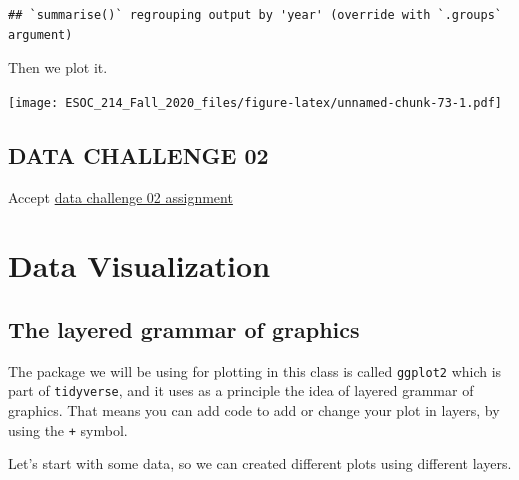 \documentclass[
]{book}
\newenvironment{Shaded}{\begin{snugshade}}{\end{snugshade}}
\newcommand{\DataTypeTok}[1]{\textcolor[rgb]{0.13,0.29,0.53}{#1}}
\newcommand{\KeywordTok}[1]{\textcolor[rgb]{0.13,0.29,0.53}{\textbf{#1}}}
\newcommand{\NormalTok}[1]{#1}
\newcommand{\OperatorTok}[1]{\textcolor[rgb]{0.81,0.36,0.00}{\textbf{#1}}}
\newcommand{\StringTok}[1]{\textcolor[rgb]{0.31,0.60,0.02}{#1}}
\begin{document}
\begin{verbatim}
## `summarise()` regrouping output by 'year' (override with `.groups` argument)
\end{verbatim}

Then we plot it.

\begin{Shaded}
\end{Shaded}

\texttt{[image: ESOC\_214\_Fall\_2020\_files/figure-latex/unnamed-chunk-73-1.pdf]}

\hypertarget{data-challenge-02}{%
\section{DATA CHALLENGE 02}\label{data-challenge-02}}

Accept \href{https://classroom.github.com/a/DhH5ciNQ}{data challenge 02 assignment}

\hypertarget{data-visualization}{%
\chapter{Data Visualization}\label{data-visualization}}

\hypertarget{the-layered-grammar-of-graphics}{%
\section{The layered grammar of graphics}\label{the-layered-grammar-of-graphics}}

The package we will be using for plotting in this class is called \texttt{ggplot2} which is part of \texttt{tidyverse}, and it uses as a principle the idea of layered grammar of graphics. That means you can add code to add or change your plot in layers, by using the \texttt{+} symbol.

Let's start with some data, so we can created different plots using different layers.
\end{document}

